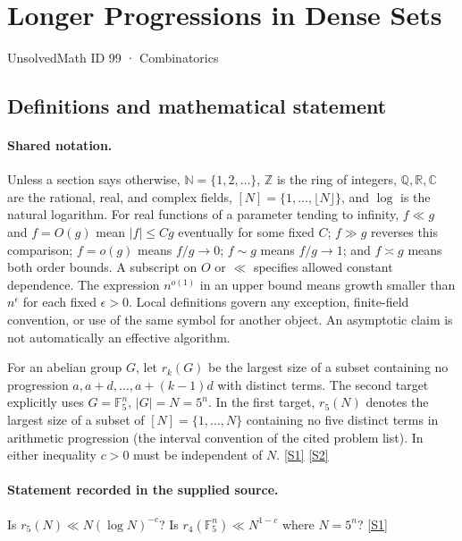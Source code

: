 \documentclass[11pt,a4paper]{article}
\newcommand{\N}{\mathbb{N}}
\newcommand{\Z}{\mathbb{Z}}
\newcommand{\Q}{\mathbb{Q}}
\newcommand{\R}{\mathbb{R}}
\newcommand{\C}{\mathbb{C}}
\newcommand{\F}{\mathbb{F}}
\newcommand{\sref}[2]{\hyperlink{source:#1:#2}{[S#2]}}
\begin{document}

\setcounter{section}{98}

\section{Longer Progressions in Dense Sets}\label{99}

{\small\sffamily UnsolvedMath ID 99 · Combinatorics}

\subsection{Definitions and mathematical statement}

\paragraph{Shared notation.}Unless a section says otherwise, $\N=\{1,2,\ldots\}$,
$\Z$ is the ring of integers, $\Q,\R,\C$ are the rational, real, and complex
fields, $[N]=\{1,\ldots,\lfloor N\rfloor\}$, and $\log$ is the natural
logarithm. For real functions of a parameter tending to infinity,
$f\ll g$ and $f=O(g)$ mean $|f|\leq Cg$ eventually for some fixed $C$;
$f\gg g$ reverses this comparison; $f=o(g)$ means $f/g\to0$;
$f\sim g$ means $f/g\to1$; and $f\asymp g$ means both order bounds.
A subscript on $O$ or $\ll$ specifies allowed constant dependence.
The expression $n^{o(1)}$ in an upper bound means growth smaller than
$n^\epsilon$ for each fixed $\epsilon>0$. Local definitions govern any
exception, finite-field convention, or use of the same symbol for another
object. An asymptotic claim is not automatically an effective algorithm.



For an abelian group $G$, let $r_k(G)$ be the largest size of a subset containing no progression $a,a+d,\ldots,a+(k-1)d$ with distinct terms. The second target explicitly uses $G=\F_5^n$, $|G|=N=5^n$. In the first target, $r_5(N)$ denotes the largest size of a subset of $[N]=\{1,\ldots,N\}$ containing no five distinct terms in arithmetic progression (the interval convention of the cited problem list). In either inequality $c>0$ must be independent of $N$. \sref{99}{1} \sref{99}{2}

\paragraph{Statement recorded in the supplied source.}
Is $r_5(N) \ll N(\log N)^{-c}$? Is $r_4(\mathbb{F}_5^n) \ll N^{1-c}$ where $N = 5^n$? \sref{99}{1}
\end{document}
